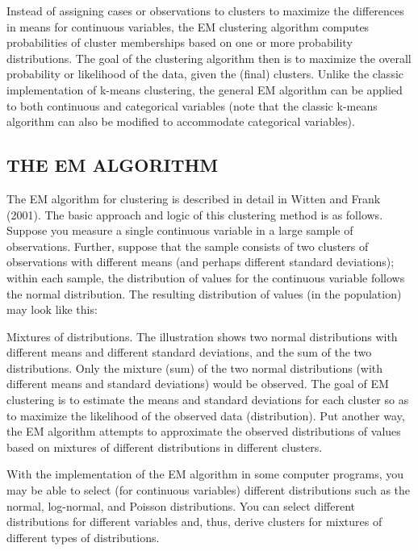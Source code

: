 Instead of assigning cases or observations to clusters to maximize the differences in means for continuous variables, the EM clustering algorithm computes probabilities of cluster memberships based on one or more probability distributions. The goal of the clustering algorithm then is to maximize the overall probability or likelihood of the data, given the (final) clusters.
Unlike the classic implementation of k-means clustering, the general EM algorithm can be applied to both continuous and categorical variables (note that the classic k-means algorithm can also be modified to accommodate categorical variables).



\subsection*{THE EM ALGORITHM}

The EM algorithm for clustering is described in detail in Witten and Frank (2001). The basic approach and logic of this clustering method is as follows. Suppose you measure a single continuous variable in a large sample of observations. Further, suppose that the sample consists of two clusters of observations with different means (and perhaps different standard deviations); within each sample, the distribution of values for the continuous variable follows the normal distribution. The resulting distribution of values (in the population) may look like this:



Mixtures of distributions. The illustration shows two normal distributions with different means and different standard deviations, and the sum of the two distributions. Only the mixture (sum) of the two normal distributions (with different means and standard deviations) would be observed. The goal of EM clustering is to estimate the means and standard deviations for each cluster so as to maximize the likelihood of the observed data (distribution). Put another way, the EM algorithm attempts to approximate the observed distributions of values based on mixtures of different distributions in different clusters.

With the implementation of the EM algorithm in some computer programs, you may be able to select (for continuous variables) different distributions such as the normal, log-normal, and Poisson distributions. You can select different distributions for different variables and, thus, derive clusters for mixtures of different types of distributions.


